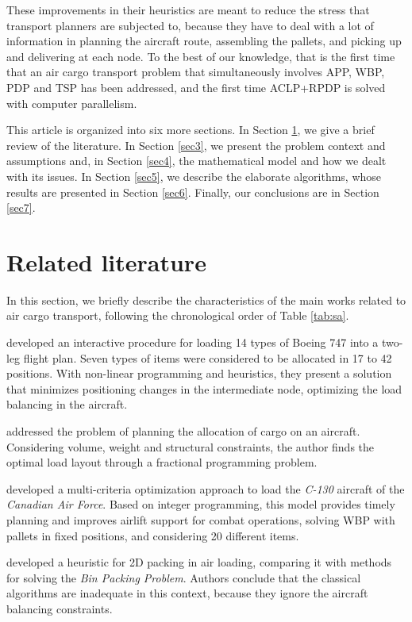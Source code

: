 \documentclass[preprint,authoryear]{elsarticle}
\begin{document}
These improvements in their heuristics are meant to reduce the stress that transport planners are subjected to, because they have to deal with a lot of information in planning the aircraft route, assembling the pallets, and picking up and delivering at each node. To the best of our knowledge, that is the first time that an air cargo transport problem that simultaneously involves APP, WBP, PDP and TSP has been addressed, and the first time ACLP+RPDP is solved with computer parallelism.

This article is organized into six more sections. In Section \ref{sec2}, we give a brief review of the literature. In Section \ref{sec3}, we present the problem context and assumptions and, in Section \ref{sec4}, the mathematical model and how we dealt with its issues. In Section \ref{sec5}, we describe the elaborate algorithms, whose results are presented in Section \ref{sec6}. Finally, our conclusions are in Section \ref{sec7}.


\section{Related literature}
\label{sec2}

In this section, we briefly describe the characteristics of the main works related to air cargo transport, following the chronological order of Table \ref{tab:sa}.

\cite{LarsenMikkelsen1979} developed an interactive procedure for loading 14 types of Boeing 747 into a two-leg flight plan. Seven types of items were considered to be allocated in 17 to 42 positions. With non-linear programming and heuristics, they present a solution that minimizes positioning changes in the intermediate node, optimizing the load balancing in the aircraft.

\cite{Brosh1981} addressed the problem of planning the allocation of cargo on an aircraft. Considering volume, weight and structural constraints, the author finds the optimal load layout through a fractional programming problem.

\cite{Kevin1992} developed a multi-criteria optimization approach to load the {\it C-130} aircraft of the {\it Canadian Air Force}. Based on integer programming, this model provides timely planning and improves airlift support for combat operations, solving WBP with pallets in fixed positions, and considering 20 different items.

\cite{Heidelberg1998} developed a heuristic for 2D packing in air loading, comparing it with methods for solving the {\it Bin Packing Problem}. Authors conclude that the classical algorithms are inadequate in this context, because they ignore the aircraft balancing constraints.
\end{document}
